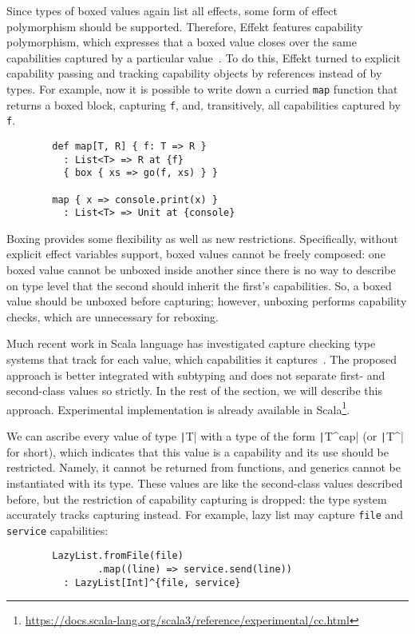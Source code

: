 \documentclass[conference]{IEEEtran}
\begin{document}
    Since types of boxed values again list all effects, some form of effect polymorphism should be supported.
    Therefore, Effekt features capability polymorphism, which expresses that a boxed value closes over the same capabilities captured by a particular value~\cite{brachthauser2022effects}.
    To do this, Effekt turned to explicit capability passing and tracking capability objects by references instead of by types.
    For example, now it is possible to write down a curried \texttt{map} function that returns a boxed block, capturing \texttt{f}, and, transitively, all capabilities captured by \texttt{f}.
    \begin{verbatim}
        def map[T, R] { f: T => R }
          : List<T> => R at {f}
          { box { xs => go(f, xs) } }

        map { x => console.print(x) }
          : List<T> => Unit at {console}
    \end{verbatim}

    Boxing provides some flexibility as well as new restrictions.
    Specifically, without explicit effect variables support, boxed values cannot be freely composed: one boxed value cannot be unboxed inside another since there is no way to describe on type level that the second should inherit the first's capabilities.
    So, a boxed value should be unboxed before capturing; however, unboxing performs capability checks, which are unnecessary for reboxing.

    Much recent work in Scala language has investigated capture checking type systems that track for each value, which capabilities it captures~\cite{odersky2022scoped, boruch2023capturing}.
    The proposed approach is better integrated with subtyping and does not separate first- and second-class values so strictly.
    In the rest of the section, we will describe this approach.
    Experimental implementation is already available in Scala\footnote{\url{https://docs.scala-lang.org/scala3/reference/experimental/cc.html}}.

    We can ascribe every value of type \texttt|T| with a type of the form \texttt|T^{cap}| (or \texttt|T^| for short), which indicates that this value is a capability and its use should be restricted.
    Namely, it cannot be returned from functions, and generics cannot be instantiated with its type.
    These values are like the second-class values described before, but the restriction of capability capturing is dropped: the type system accurately tracks capturing instead.
    For example, lazy list may capture \texttt{file} and \texttt{service} capabilities:
    \begin{verbatim}
        LazyList.fromFile(file)
                .map((line) => service.send(line))
          : LazyList[Int]^{file, service}
    \end{verbatim}
\end{document}
